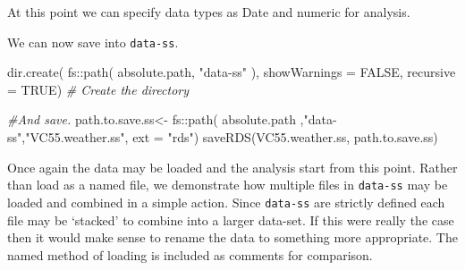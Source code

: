 \documentclass{article}
\newenvironment{Shaded}{\begin{snugshade}}{\end{snugshade}}
\newcommand{\AttributeTok}[1]{\textcolor[rgb]{0.77,0.63,0.00}{#1}}
\newcommand{\CommentTok}[1]{\textcolor[rgb]{0.56,0.35,0.01}{\textit{#1}}}
\newcommand{\ConstantTok}[1]{\textcolor[rgb]{0.00,0.00,0.00}{#1}}
\newcommand{\FunctionTok}[1]{\textcolor[rgb]{0.00,0.00,0.00}{#1}}
\newcommand{\NormalTok}[1]{#1}
\newcommand{\OtherTok}[1]{\textcolor[rgb]{0.56,0.35,0.01}{#1}}
\newcommand{\SpecialCharTok}[1]{\textcolor[rgb]{0.00,0.00,0.00}{#1}}
\newcommand{\StringTok}[1]{\textcolor[rgb]{0.31,0.60,0.02}{#1}}
\begin{document}
At this point we can specify data types as Date and numeric for analysis.

\begin{Shaded}
\end{Shaded}

We can now save into \texttt{data-ss}.

\begin{Shaded}
\begin{Highlighting}[]
\FunctionTok{dir.create}\NormalTok{( }
\NormalTok{          fs}\SpecialCharTok{::}\FunctionTok{path}\NormalTok{( absolute.path,}
            \StringTok{"data{-}ss"}\NormalTok{ ),  }
            \AttributeTok{showWarnings =} \ConstantTok{FALSE}\NormalTok{,}
            \AttributeTok{recursive =} \ConstantTok{TRUE}\NormalTok{) }\CommentTok{\# Create the directory}

\CommentTok{\#And save.}
\NormalTok{path.to.save.ss}\OtherTok{\textless{}{-}}\NormalTok{ fs}\SpecialCharTok{::}\FunctionTok{path}\NormalTok{( absolute.path}
\NormalTok{                               ,}\StringTok{"data{-}ss"}\NormalTok{,}\StringTok{"VC55.weather.ss"}\NormalTok{, }\AttributeTok{ext =} \StringTok{"rds"}\NormalTok{)}
\FunctionTok{saveRDS}\NormalTok{(VC55.weather.ss, path.to.save.ss)}
\end{Highlighting}
\end{Shaded}

Once again the data may be loaded and the analysis start from this point. Rather than load as a named file, we demonstrate how multiple files in \texttt{data-ss} may be loaded and combined in a simple action. Since \texttt{data-ss} are strictly defined each file may be `stacked' to combine into a larger data-set. If this were really the case then it would make sense to rename the data to something more appropriate. The named method of loading is included as comments for comparison.
\end{document}
